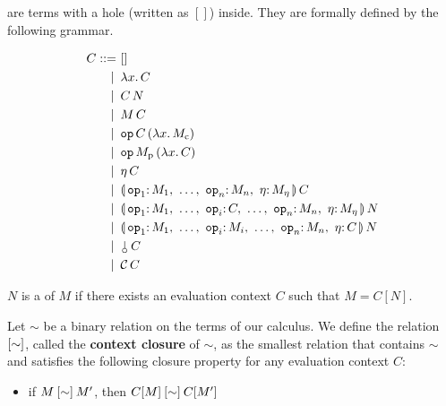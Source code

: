 \begin{definition}
   are terms with a hole (written as $[]$)
  inside. They are formally defined by the following grammar.

  \begin{align*}
  C ::= &\ [] \\
   | \, &\ \lam{x}{C}  \\
   | \, &\ \ap{C}{N}  \\
   | \, &\ \ap{M}{C}  \\
   | \, &\ \app{\op{op}}{C}{(\lam{x}{M_{\mathrm{c}}})} \\
   | \, &\ \app{\op{op}}{M_{\mathrm{p}}}{(\lam{x}{C})} \\
   | \, &\ \ap{\eta}{C} \\
   | \, &\ \ap{\banana{\onto{\op{op}_1} M_1,\ \dots,\ \onto{\op{op}_n} M_n,\ \onto{\eta} M_\eta}}{C} \\
   | \, &\ \ap{\banana{\onto{\op{op}_1} M_1,\ \dots,\ \onto{\op{op}_i}{C},\ \dots,\ \onto{\op{op}_n} M_n,\ \onto{\eta} M_\eta}}{N} \\
   | \, &\ \ap{\banana{\onto{\op{op}_1} M_1,\ \dots,\ \onto{\op{op}_i}{M_i},\ \dots,\ \onto{\op{op}_n} M_n,\ \onto{\eta} C}}{N} \\
   | \, &\ \ap{\cherry}{C} \\
   | \, &\ \ap{\CC}{C}
  \end{align*}
\end{definition}

\begin{definition}
  $N$ is a  of $M$ if there exists an evaluation context $C$
  such that $M = C[N]$.
\end{definition}

\begin{definition}\label{def:context-closure}
  Let $\sim$ be a binary relation on the terms of our calculus. We define
  the relation $\mathbin{[\sim]}$, called the \textbf{context closure} of
  $\sim$, as the smallest relation
  that contains $\sim$ and satisfies the following closure property for any
  evaluation context $C$:

  \begin{itemize}
    \item if $M \mathbin{[\sim]} M'$, then $C[M] \mathbin{[\sim]} C[M']$
  \end{itemize}
\end{definition}

